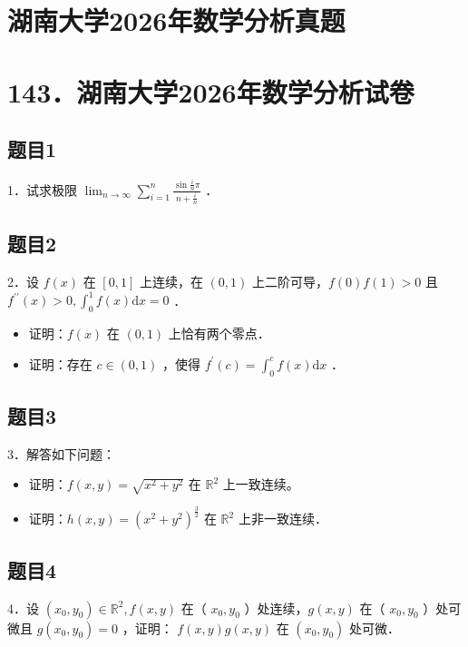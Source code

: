 \documentclass{article}
\begin{document}
\section*{湖南大学2026年数学分析真题}
\section*{143．湖南大学2026年数学分析试卷}

\subsection{题目1}
1．试求极限 \(\lim _{n \rightarrow \infty} \sum_{i=1}^{n} \frac{\sin \frac{i}{n} \pi}{n+\frac{i}{n}}\) ．

\subsection{题目2}
2．设 \(f(x)\) 在 \([0,1]\) 上连续，在 \((0,1)\) 上二阶可导，\(f(0) f(1)>0\) 且 \(f^{\prime \prime}(x)>0, \int_{0}^{1} f(x) \mathrm{d} x=0\) ．

\begin{itemize}
  \item[（1）] 证明：\(f(x)\) 在 \((0,1)\) 上恰有两个零点．
  \item[（2）] 证明：存在 \(c \in(0,1)\) ，使得 \(f^{\prime}(c)=\int_{0}^{c} f(x) \mathrm{d} x\) ．
\end{itemize}

\subsection{题目3}
3．解答如下问题：

\begin{itemize}
  \item[（1）] 证明：\(f(x, y)=\sqrt{x^{2}+y^{2}}\) 在 \(\mathbb{R}^{2}\) 上一致连续。
  \item[（2）] 证明：\(h(x, y)=\left(x^{2}+y^{2}\right)^{\frac{3}{2}}\) 在 \(\mathbb{R}^{2}\) 上非一致连续．
\end{itemize}

\subsection{题目4}
4．设 \(\left(x_{0}, y_{0}\right) \in \mathbb{R}^{2}, f(x, y)\) 在（ \(x_{0}, y_{0}\) ）处连续，\(g(x, y)\) 在（ \(x_{0}, y_{0}\) ）处可微且 \(g\left(x_{0}, y_{0}\right)=0\) ，证明： \(f(x, y) g(x, y)\) 在 \(\left(x_{0}, y_{0}\right)\) 处可微．
\end{document}
